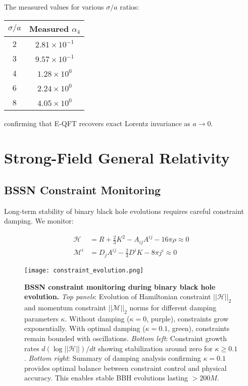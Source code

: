 \documentclass[11pt,a4paper]{article}
\begin{document}
The measured values for various $\sigma/a$ ratios:
\begin{center}
\begin{tabular}{cc}
\hline
$\sigma/a$ & Measured $\alpha_4$ \\
\hline
2 & $2.81 \times 10^{-1}$ \\
3 & $9.57 \times 10^{-1}$ \\
4 & $1.28 \times 10^{0}$ \\
6 & $2.24 \times 10^{0}$ \\
8 & $4.05 \times 10^{0}$ \\
\hline
\end{tabular}
\end{center}

confirming that E-QFT recovers exact Lorentz invariance as $a \to 0$.

\section{Strong-Field General Relativity}

\subsection{BSSN Constraint Monitoring}

Long-term stability of binary black hole evolutions requires careful constraint damping. We monitor:

\begin{align}
\mathcal{H} &= R + \frac{2}{3}K^2 - A_{ij}A^{ij} - 16\pi\rho \approx 0 \\
\mathcal{M}^i &= D_j A^{ij} - \frac{2}{3} D^i K - 8\pi j^i \approx 0
\end{align}

\begin{figure}[H]
\centering
\texttt{[image: constraint\_evolution.png]}
\caption{\textbf{BSSN constraint monitoring during binary black hole evolution.} \textit{Top panels}: Evolution of Hamiltonian constraint $||\mathcal{H}||_2$ and momentum constraint $||\mathcal{M}||_2$ norms for different damping parameters $\kappa$. Without damping ($\kappa=0$, purple), constraints grow exponentially. With optimal damping ($\kappa=0.1$, green), constraints remain bounded with oscillations. \textit{Bottom left}: Constraint growth rates $d(\log||\mathcal{H}||)/dt$ showing stabilization around zero for $\kappa \geq 0.1$. \textit{Bottom right}: Summary of damping analysis confirming $\kappa = 0.1$ provides optimal balance between constraint control and physical accuracy. This enables stable BBH evolutions lasting $> 200M$.}
\label{fig:constraints}
\end{figure}
\end{document}
